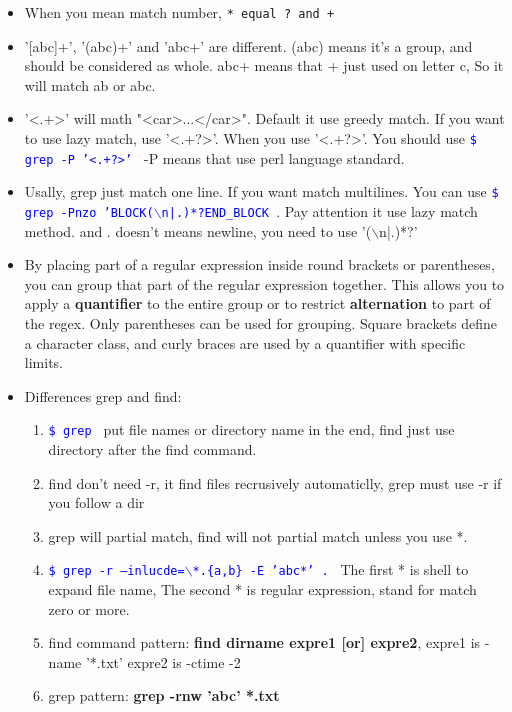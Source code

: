 \documentclass[a4paper,12pt,twoside]{book}
\newcommand{\linuxcommand}[1]{\texttt{\textcolor{blue}{\$ #1 \Pisymbol{psy}{191}}}}
\begin{document}
\begin{itemize}
\begin{tabular}{p{}|p{}|p{}}
\end{tabular}

\item When you mean match number, \verb=* equal ? and + = 

\item '[abc]+',  '(abc)+' and 'abc+' are different.  (abc) means it's a group, and should be considered as whole. abc+ means that + just used on letter c, So it will match ab or abc.  

\item '<.+>' will math "<car>...</car>". Default it use greedy match. If you want to use lazy match, use '<.+?>'. When you use '<.+?>'.  You should use \linuxcommand{grep -P '<.+?>'} -P means that use perl language standard. 

\item Usally, grep just match one line. If you want match multilines. You can use \linuxcommand{grep -Pnzo 'BLOCK($\backslash$n|.)*?END\_BLOCK }.  Pay attention it use lazy match method. and . doesn't means newline, you need to use '($\backslash$n|.)*?'

\item By placing part of a regular expression inside round brackets or parentheses, you can group that part of the regular expression together. This allows you to apply a \textbf{quantifier} to the entire group or to restrict \textbf{alternation} to part of the regex.  Only parentheses can be used for grouping. Square brackets define a character class, and curly braces are used by a quantifier with specific limits.

\item Differences grep and find:
		\begin{enumerate}
				\item \linuxcommand{grep} put file names or directory name in the end, find just use directory after the find command.
				\item find don't need -r, it find files recrusively automaticlly, grep must use -r if you follow a dir
				\item grep will partial match, find will not partial match unless you use *.
				\item \linuxcommand{grep -r --inlucde=$\backslash$*.\{a,b\} -E 'abc*' .} The first * is shell to expand file name, The second * is regular expression, stand for match zero or more. 
				\item find command pattern: \textbf{find dirname expre1 [or] expre2}, expre1 is -name '*.txt' expre2 is -ctime -2 
				\item grep pattern: \textbf{grep -rnw 'abc' *.txt}
		\end{enumerate}
\end{itemize}
\end{document}

